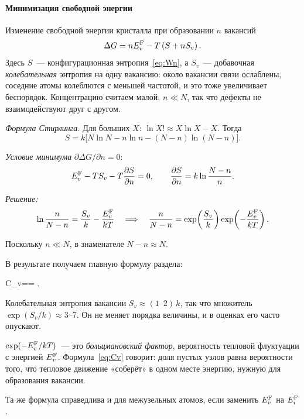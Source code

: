 \paragraph{Минимизация свободной энергии}
Изменение свободной энергии кристалла при образовании $n$ вакансий
\begin{equation}\label{eq:dG}
\Delta G = nE_{v}^{\mathrm{F}} - T\left(S+nS_v\right).
\end{equation}
Здесь $S$~— конфигурационная энтропия~\eqref{eq:Wn}, а $S_v$~— добавочная
\emph{колебательная} энтропия на одну вакансию: около вакансии связи
ослаблены, соседние атомы колеблются с меньшей частотой, и это тоже
увеличивает беспорядок. Концентрацию считаем малой, $n\ll N$, так что
дефекты не взаимодействуют друг с другом.

\begin{shagi}
\item \emph{Формула Стирлинга.} Для больших $X$: $\ln X!\approx X\ln X-X$.
Тогда
\[
S=k\bigl[N\ln N-n\ln n-(N-n)\ln(N-n)\bigr].
\]
\item \emph{Условие минимума} $\partial\Delta G/\partial n=0$:
\[
E_{v}^{\mathrm{F}}-TS_v-T\frac{\partial S}{\partial n}=0,\qquad
\frac{\partial S}{\partial n}=k\ln\frac{N-n}{n}.
\]
\item \emph{Решение:}
\[
\ln\frac{n}{N-n}=\frac{S_v}{k}-\frac{E_{v}^{\mathrm{F}}}{kT}
\quad\Longrightarrow\quad
\frac{n}{N-n}=\exp\!\left(\frac{S_v}{k}\right)\exp\!\left(-\frac{E_{v}^{\mathrm{F}}}{kT}\right).
\]
\item Поскольку $n\ll N$, в знаменателе $N-n\approx N$.
\end{shagi}

В результате получаем главную формулу раздела:
\begin{keyeq}\label{eq:Cv}
C_v==\approx{} .
\end{keyeq}
Колебательная энтропия вакансии $S_v\approx(1\text{--}2)\,k$, так что
множитель $\exp(S_v/k)\approx 3$--$7$. Он не меняет порядка величины, и
в оценках его часто опускают.

\begin{smysl}
$\exp(-E_{v}^{\mathrm{F}}/kT)$~— это \emph{больцмановский фактор}, вероятность
тепловой флуктуации с энергией $E_{v}^{\mathrm{F}}$. Формула~\eqref{eq:Cv} говорит:
доля пустых узлов равна вероятности того, что тепловое движение
«соберёт» в одном месте энергию, нужную для образования вакансии.
\end{smysl}

Та же формула справедлива и для межузельных атомов, если заменить
$E_{v}^{\mathrm{F}}$ на $E_{i}^{\mathrm{F}}$.

